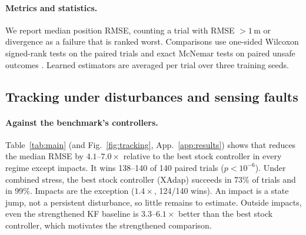 \paragraph{Metrics and statistics.}
We report median position RMSE, counting a trial with RMSE $>1$\,m or divergence as a failure that is ranked worst. Comparisons use one-sided Wilcoxon signed-rank tests on the paired trials \citep{wilcoxon1945individual} and exact McNemar tests on paired unsafe outcomes \citep{mcnemar1947note}.
Learned estimators are averaged per trial over three training seeds.

\subsection{Tracking under disturbances and sensing faults}
\label{sec:exp-tracking}


\begin{table}[t]
  \centering\small
  \caption{Median position RMSE [cm] per regime (140 paired trials each). Superscripts give the success rate when below 100\%. Bold marks the best NMPC variant. The gain and wins compare \ours{} (GDN, three-seed mean) with the \emph{best} stock controller in that regime, chosen post hoc; all $p<10^{-6}$ (one-sided Wilcoxon).}
  \label{tab:main}
  \resizebox{\linewidth}{!}{}
\end{table}

\paragraph{Against the benchmark's controllers.}
Table~\ref{tab:main} (and Fig.~\ref{fig:tracking}, App.~\ref{app:results}) shows that \ours{} reduces the median RMSE by $4.1$--$7.0\times$ relative to the best stock controller in every regime except impacts. It wins 138--140 of 140 paired trials ($p<10^{-6}$).
Under combined stress, the best stock controller (XAdap) succeeds in 73\% of trials and \ours{} in 99\%.
Impacts are the exception ($1.4\times$, 124/140 wins). An impact is a state jump, not a persistent disturbance, so little remains to estimate.
Outside impacts, even the strengthened KF baseline is $3.3$--$6.1\times$ better than the best stock controller, which motivates the strengthened comparison.


